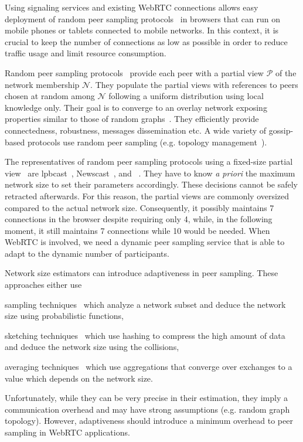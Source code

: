 Using signaling services and existing WebRTC connections allows easy
deployment of random peer sampling protocols~\cite{jelasity2004peer} in
browsers that can run on mobile phones or tablets connected to mobile
networks. In this context, it is crucial to keep the number of connections as
low as possible in order to reduce traffic usage and limit resource
consumption.

Random peer sampling protocols~\cite{jelasity2004peer, jelasity2007gossip} 
provide each
peer with a partial view $\mathcal{P}$ of the network membership
$\mathcal{N}$. They populate the partial views with references to
peers chosen at random among $\mathcal{N}$ following a uniform
distribution using local knowledge only. Their goal is to converge to
an overlay network exposing properties similar to those of random
graphs~\cite{erdos1959random}. They efficiently provide connectedness,
robustness, messages dissemination etc. A wide variety of gossip-based
protocols use random peer sampling (e.g. topology
management~\cite{voulgaris2005epidemic, jelasity2009tman,
  dabek2004vivaldi}).

The representatives of random peer sampling protocols using a fixed-size
partial view~\cite{jelasity2007gossip} are
lpbcast~\cite{eugster2003lightweight}, Newscast~\cite{tolgyeski2009adaptive},
and \CYCLON~\cite{voulgaris2005cyclon}. They have to know \emph{a priori} the
maximum network size to set their parameters
accordingly. These decisions cannot be safely retracted afterwards. For this
reason, the partial views are commonly oversized compared to the actual network
size. Consequently, it possibly maintains 7 connections in the browser despite
requiring only 4, while, in the following moment, it still maintains 7 connections
while 10 would be needed. When WebRTC is involved, we need a dynamic peer sampling
service that is able to adapt to the dynamic number of participants.

Network size estimators can introduce adaptiveness in peer sampling. These
approaches either use
\begin{inparaenum}[(i)]
\item sampling techniques~\cite{mane05network, ganesh2007peer,
    kostoulas2007active} which analyze a network subset and deduce the network
  size using probabilistic functions,
\item sketching techniques~\cite{flajolet2008hyperloglog, baquero2012extrema}
  which use hashing to compress the high amount of data and deduce the network
  size using the collisions,
\item averaging techniques~\cite{jelasity2004epidemic, blasa2011symmetric}
  which use aggregations that converge over exchanges to a value which depends
  on the network size.
\end{inparaenum}
Unfortunately, while they can be very precise in their estimation, they imply a
communication overhead and may have strong assumptions (e.g. random graph
topology). However, adaptiveness should introduce a minimum overhead
to peer sampling in WebRTC applications.

